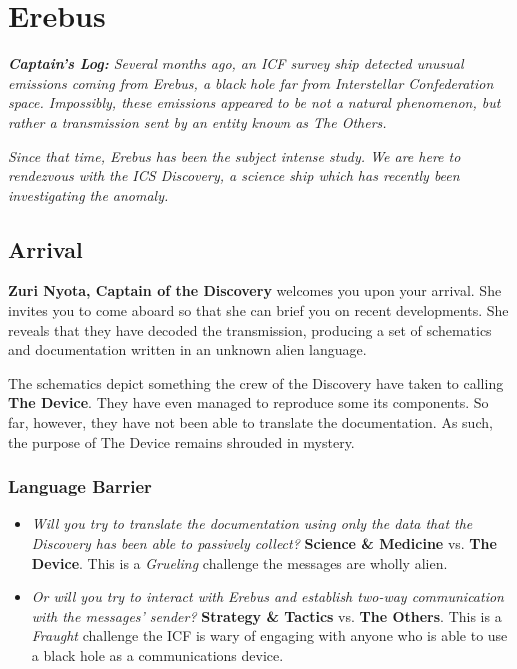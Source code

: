 \documentclass[11pt, a5paper, parskip=half-, DIV=12]{scrartcl}
\begin{document}
\section*{Erebus}
\textit{\textbf{Captain's Log:} Several months ago, an ICF survey ship detected unusual emissions coming from Erebus, a black hole far from Interstellar Confederation space. Impossibly, these emissions appeared to be not a natural phenomenon, but rather a transmission sent by an entity known as The Others.}

\textit{Since that time, Erebus has been the subject intense study. We are here to rendezvous with the ICS Discovery, a science ship which has recently been investigating the anomaly.}

\subsection*{Arrival}
\textbf{Zuri Nyota, Captain of the Discovery} welcomes you upon your arrival.  She invites you to come aboard so that she can brief you on recent developments. She reveals that they have decoded the transmission, producing a set of schematics and documentation written in an unknown alien language.

The schematics depict something the crew of the Discovery have taken to calling \textbf{The Device}. They have even managed to reproduce some its components. So far, however, they have not been able to translate the documentation. As such, the purpose of The Device remains shrouded in mystery.

\subsubsection*{Language Barrier}
\begin{itemize}
	\item \textit{Will you try to translate the documentation using only the data that the Discovery has been able to passively collect?} \textbf{Science \& Medicine} vs. \textbf{The Device}. This is a \textit{Grueling} challenge \textendash{} the messages are wholly alien.
	\item \textit{Or will you try to interact with Erebus and establish two-way communication with the messages' sender?} \textbf{Strategy \& Tactics} vs. \textbf{The Others}. This is a \textit{Fraught} challenge \textendash{} the ICF is wary of engaging with anyone who is able to use a black hole as a communications device.
\end{itemize}
\end{document}
